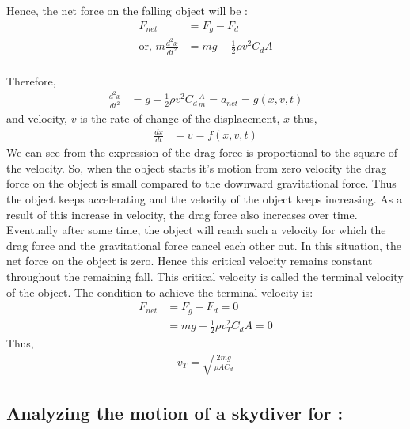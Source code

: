 \documentclass[a4paper, 14pt]{extarticle}
\begin{document}
Hence, the net force on the falling object will be \citep{kincanon1990} :
\begin{align*}
F_{net} &= F_g - F_d \\
\text{or, } m \frac{d^2x}{dt^2}&=mg-\frac{1}{2} \rho v^2 C_d A
\end{align*}
\\Therefore,
\begin{align}
\frac{d^2x}{dt^2}&=g-\frac{1}{2} \rho v^2 C_d \frac{A}{m} = a_{net} = g(x, v, t)
\end{align}
and velocity, $v$ is the rate of change of the displacement, $x$ thus,
\begin{align}
\frac{dx}{dt} &= v = f(x, v, t)  
\end{align}
We can see from the expression of the drag force is proportional to the square of the velocity. So, when the object starts it's motion from zero velocity the drag force on the object is small compared to the downward gravitational force. Thus the object keeps accelerating and the velocity of the object keeps increasing. As a result of this increase in velocity, the drag force also increases over time. Eventually after some time, the object will reach such a velocity for which the drag force and the gravitational force cancel each other out. In this situation, the net force on the object is zero. Hence this critical velocity remains constant throughout the remaining fall. This critical velocity is called the terminal velocity of the object. The condition to achieve the terminal velocity is:
\begin{align*}
F_{net}&=F_g - F_d=0 \\
&=mg-\frac{1}{2} \rho v_T^2 C_d A=0
\end{align*}
Thus,
\begin{align}
v_T=\sqrt{\frac{2mg}{\rho A C_d}}
\end{align}
\subsection {Analyzing the motion of a skydiver for :}
\end{document}
